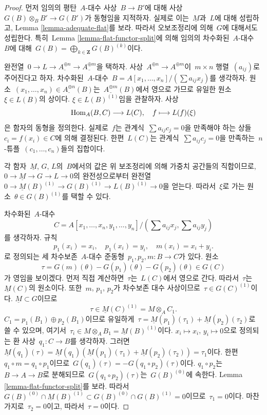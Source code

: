 \begin{proof}
먼저 임의의 평탄\  $A$-대수 사상\  $B \to B'$에 대해 사상\ 
$G(B) \otimes_B B' \to G(B')$가 동형임을 지적하자. 실제로 이는\ 
$\underline{M}$과\  $L$에 대해 성립하고, Lemma
\ref{lemma-adequate-flat}를 보라. 따라서 오보조정리에 의해\  $G$에
대해서도 성립한다. 특히\  Lemma \ref{lemma-flat-functor-split}에 의해
임의의 차수화된\  $A$-대수\  $B$에 대해\ 
$G(B) = \bigoplus_{k \in \mathbf{Z}} G(B)^{(k)}$이다.

\medskip\noindent
완전열\ 
$0 \to L \to \underline{A^{\oplus n}} \to \underline{A^{\oplus m}}$을
택하자. 사상\  $A^{\oplus n} \to A^{\oplus m}$이\  $m \times n$ 행렬\ 
$(a_{ij})$로 주어진다고 하자. 차수화된\  $A$-대수\ 
$B = A[x_1, \ldots, x_n]/(\sum a_{ij}x_j)$를 생각하자. 원소\ 
$(x_1, \ldots, x_n) \in \underline{A^{\oplus n}}(B)$는\ 
$\underline{A^{\oplus m}}(B)$에서 영으로 가므로 유일한 원소\ 
$\xi \in L(B)$의 상이다. $\xi \in L(B)^{(1)}$임을 관찰하자. 사상
$$
\mathop{\mathrm{Hom}}\nolimits_A(B, C) \longrightarrow L(C), \quad
f \longmapsto L(f)(\xi)
$$
은 함자의 동형을 정의한다. 실제로\  $f$는 관계식\ 
$\sum a_{ij}c_j = 0$을 만족해야 하는 상들\ 
$c_i = f(x_i) \in C$에 의해 결정된다. 한편\  $L(C)$는 관계식\ 
$\sum a_{ij} c_j = 0$을 만족하는\  $n$-튜플\ 
$(c_1, \ldots, c_n)$들의 집합이다.

\medskip\noindent
각 함자\  $\underline{M}$, $G$, $L$의\  $B$에서의 값은 위 보조정리에
의해 가중치 공간들의 직합이므로, $0 \to \underline{M} \to G \to L \to 0$의
완전성으로부터 완전열\ 
$0 \to \underline{M}(B)^{(1)} \to G(B)^{(1)} \to L(B)^{(1)} \to 0$을
얻는다. 따라서\  $\xi$로 가는 원소\  $\theta \in G(B)^{(1)}$를 택할 수
있다.

\medskip\noindent
차수화된\  $A$-대수
$$
C = A[x_1, \ldots, x_n, y_1, \ldots, y_n]/
(\sum a_{ij}x_j, \sum a_{ij}y_j)
$$
를 생각하자. 규칙
$$
p_1(x_i) = x_i, \quad
p_1(x_i) = y_i, \quad
m(x_i) = x_i + y_i.
$$
로 정의되는 세 차수보존\  $A$-대수 준동형\ 
$p_1, p_2, m : B \to C$가 있다. 원소
$$
\tau = G(m)(\theta) - G(p_1)(\theta) - G(p_2)(\theta) \in G(C)
$$
가 영임을 보이겠다. 먼저 직접 계산하면\  $\tau$는\  $L(C)$에서 영으로
간다. 따라서\  $\tau$는\  $\underline{M}(C)$의 원소이다. 또한\ 
$m$, $p_1$, $p_2$가 차수보존 대수 사상이므로\ 
$\tau \in G(C)^{(1)}$이다. $\underline{M} \subset G$이므로
$$
\tau \in \underline{M}(C)^{(1)} = M \otimes_A C_1.
$$
$C_1 = p_1(B_1) \oplus p_2(B_1)$이므로 유일하게\ 
$\tau = \underline{M}(p_1)(\tau_1) + \underline{M}(p_2)(\tau_2)$로
쓸 수 있으며, 여기서\ 
$\tau_i \in M \otimes_A B_1 = \underline{M}(B)^{(1)}$이다.
$x_i \mapsto x_i$, $y_i \mapsto 0$으로 정의되는 환 사상\ 
$q_1 : C \to B$를 생각하자. 그러면\ 
$\underline{M}(q_1)(\tau) =
\underline{M}(q_1)(\underline{M}(p_1)(\tau_1) + \underline{M}(p_2)(\tau_2)) =
\tau_1$이다. 한편\  $q_1 \circ m = q_1 \circ p_1$이므로\ 
$G(q_1)(\tau) = - G(q_1 \circ p_2)(\tau)$이다. $q_1 \circ p_2$는\ 
$B \to A \to B$로 분해되므로\  $G(q_1 \circ p_2)(\tau)$는\ 
$G(B)^{(0)}$에 속한다. Lemma \ref{lemma-flat-functor-split}를 보라.
따라서\ 
$G(B)^{(0)} \cap \underline{M}(B)^{(1)} \subset
G(B)^{(0)} \cap G(B)^{(1)} = 0$이므로\  $\tau_1 = 0$이다. 마찬가지로\ 
$\tau_2 = 0$이고, 따라서\  $\tau = 0$이다.


\end{proof}
